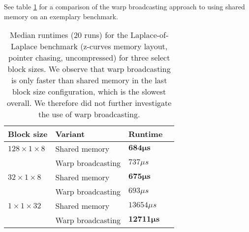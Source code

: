 See table \ref{tab:warp-broadcasting} for a comparison of the warp broadcasting approach to using shared memory on an exemplary benchmark.

\begin{table}
	\begin{tabular}{l l l l}
		\hline
		\textbf{Block size} & \textbf{Variant} & \textbf{Runtime} \\
		\hline
		\hline
		$128\times 1 \times 8$ & Shared memory 	   & $\mathbf{684 \mu s}$ \\
							   & Warp broadcasting & $737 \mu s$ \\
		\hline
		$32\times 1\times 8$ & Shared memory & $\mathbf{675 \mu s}$ \\
							 & Warp broadcasting & $693 \mu s$ \\
		\hline
		$1\times 1\times 32$ & Shared memory & $13654 \mu s$ \\
							 & Warp broadcasting & $\mathbf{12711 \mu s}$ \\
		\hline
	\end{tabular}
	\caption{\label{tab:warp-broadcasting}Median runtimes (20 runs) for the Laplace-of-Laplace benchmark (z-curves memory layout, pointer chasing, uncompressed) for three select block sizes. We observe that warp broadcasting is only faster than shared memory in the last block size configuration, which is the slowest overall. We therefore did not further investigate the use of warp broadcasting.}
\end{table}
